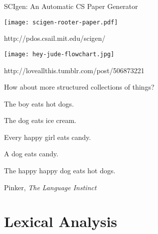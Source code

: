 \documentclass{plt}
\begin{document}
\begin{frame}{SCIgen: An Automatic CS Paper Generator}

\texttt{[image: scigen-rooter-paper.pdf]}

\tiny
http://pdos.csail.mit.edu/scigen/
\end{frame}

\begin{frame}
\centerline{\texttt{[image: hey-jude-flowchart.jpg]}}

\footnotesize http://loveallthis.tumblr.com/post/506873221
\end{frame}

\begin{frame}[fragile]{How about more structured collections of things?}

The boy eats hot dogs.

The dog eats ice cream.

Every happy girl eats candy.

A dog eats candy.

The happy happy dog eats hot dogs.


\tiny Pinker, \emph{The Language Instinct}

\end{frame}

\part{Lexical Analysis}
\end{document}
